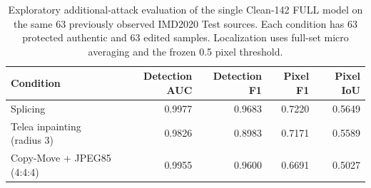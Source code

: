 \begin{table}[t]
\centering
\caption{Exploratory additional-attack evaluation of the single Clean-142 FULL model on the same 63 previously observed IMD2020 Test sources. Each condition has 63 protected authentic and 63 edited samples. Localization uses full-set micro averaging and the frozen 0.5 pixel threshold.}
\label{tab:c1_additional_attacks}
\begin{tabular}{lrrrr}
\hline
Condition & Detection AUC & Detection F1 & Pixel F1 & Pixel IoU \\
\hline
Splicing & 0.9977 & 0.9683 & 0.7220 & 0.5649 \\
Telea inpainting (radius 3) & 0.9826 & 0.8983 & 0.7171 & 0.5589 \\
Copy-Move + JPEG85 (4:4:4) & 0.9955 & 0.9600 & 0.6691 & 0.5027 \\
\hline
\end{tabular}
\end{table}
